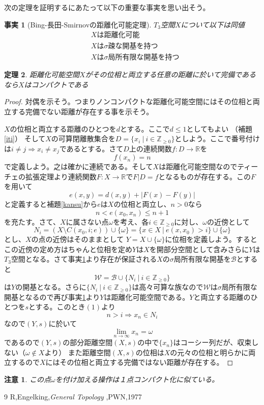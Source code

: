 \documentclass[leqno]{jsarticle}
\newtheorem{thm}{定理}
\newtheorem{fact}[thm]{事実}
\newtheorem*{cau}{注意}
\newcommand{\To}{\Longrightarrow}
\newcommand{\zz}{\mathbb{Z}}
\newcommand{\rr}{\mathbb{R}}
\newcommand{\mgn}{\infty}
\newcommand{\oo}{\omega}
\begin{document}
次の定理を証明するにあたって以下の重要な事実を思い出そう。
\begin{fact}[Bing-長田-Smirnovの距離化可能定理]\label{dis}
$T_3$空間$X$について以下は同値
\begin{align}
&\mbox{$X$は距離化可能}\\
&\mbox{$X$は$\sigma$疎な開基を持つ}\\
&\mbox{$X$は$\sigma$局所有限な開基を持つ}
\end{align}
\end{fact}
\setcounter{equation}{0}
\begin{thm}
距離化可能空間$X$がその位相と両立する任意の距離に於いて完備であるなら$X$はコンパクトである
\end{thm}
\begin{proof}
対偶を示そう。つまりノンコンパクトな距離化可能空間にはその位相と両立する完備でない距離が存在する事を示そう。\par
$X$の位相と両立する距離のひとつを$d$とする。ここで$d\le 1$としてもよい
（補題\ref{iti}）
そして$X$の可算閉離散集合を$D=\{x_i\ |\ i\in \zz_{\ge 0}\}$としよう。ここで番号付けは$i\neq j\To x_i\neq x_j$であるとする。さて$D$上の連続関数$f:D\to \rr$を
\[
f(x_n)=n
\]
で定義しよう。之は確かに連続である。そして$X$は距離化可能空間なのでティーチェの拡張定理より連続関数$F:X\to \rr$で$F|D=f$となるものが存在する。この$F$を用いて
\[
e(x,y)=d(x,y)+|F(x)-F(y)|
\]
と定義すると補題\ref{kansu}から$e$は$X$の位相と両立し、$n>0$なら
\begin{equation}
n<e(x_0,x_n)\le n+1
\end{equation}
を充たす。さて、$X$に属さない点$\oo$を考え、各$i\in \zz_{\ge 0}$に対し、$\oo$の近傍として
\[
N_i=(X\setminus C(x_0,i;e))\cup\{\omega\}=\{x\in X\ |\ e(x,x_0)>i\}\cup \{\oo\}
\]
とし、$X$の点の近傍はそのままとして
$Y=X\cup \{\oo\}$に位相を定義しよう。するとこの近傍の定め方はちゃんと位相を定め$Y$は$X$を開部分空間として含みさらに$Y$は$T_3$空間となる。さて事実\ref{dis}より存在が保証される$X$の$\sigma$局所有限な開基を$\mathcal{B}$とすると
\[
\mathcal{W}=\mathcal{B}\cup\{N_i\ |\ i\in \zz_{\ge 0}\}
\]
は$Y$の開基となる。さらに$\{N_i\ |\ i\in \zz_{\ge 0}\}$は高々可算な族なので$\mathcal{W}$は$\sigma$局所有限な開基となるので再び事実\ref{dis}より$Y$は距離化可能空間である。$Y$と両立する距離のひとつを$s$とする。このとき$(1)$より
\[
n>i\To x_n\in N_i
\]
なので$(Y,s)$に於いて
\[
\lim_{n\to \mgn} x_n= \oo
\]
であるので$(Y,s)$の部分距離空間$(X,s)$の中で$\{x_n\}$はコーシー列だが、収束しない（$\oo\not\in X$より）
また距離空間$(X,s)$の位相は$X$の元々の位相と明らかに両立するので$X$にはその位相と両立する完備ではない距離が存在する。
\end{proof}
\begin{cau}
この点$\oo$を付け加える操作は１点コンパクト化に似ている。
\end{cau}















	
\begin{thebibliography}{9}
R,Engelking,{\it General Topology },PWN,1977
\end{thebibliography}




			
\end{document}
